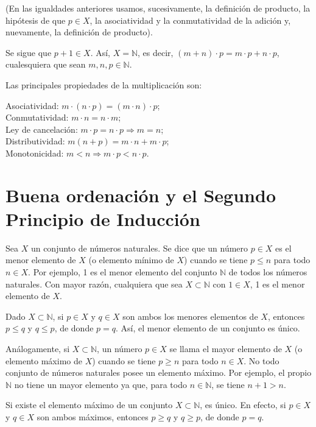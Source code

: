 (En las igualdades anteriores usamos, sucesivamente, la definición de producto, la hipótesis de que \(p \in X\), la asociatividad y la conmutatividad de la adición y, nuevamente, la definición de producto).

Se sigue que \(p + 1 \in X\). Así, \(X = \mathbb{N}\), es decir, \((m + n) \cdot p = m \cdot p + n \cdot p\), cualesquiera que sean \(m, n, p \in \mathbb{N}\).

Las principales propiedades de la multiplicación son:

Asociatividad: \(m \cdot (n \cdot p) = (m \cdot n) \cdot p\);\\
Conmutatividad: \(m \cdot n = n \cdot m\);\\
Ley de cancelación: \(m \cdot p = n \cdot p \Rightarrow m = n\);\\
Distributividad: \(m(n + p) = m \cdot n + m \cdot p\);\\
Monotonicidad: \(m < n \Rightarrow m \cdot p < n \cdot p\).

\section{Buena ordenación y el Segundo Principio de Inducción}

Sea \( X \) un conjunto de números naturales. Se dice que un número \( p \in X \) es el menor elemento de \( X \) (o elemento mínimo de \( X \)) cuando se tiene \( p \leq n \) para todo \( n \in X \). Por ejemplo, 1 es el menor elemento del conjunto \( \mathbb{N} \) de todos los números naturales. Con mayor razón, cualquiera que sea \( X \subset \mathbb{N} \) con \( 1 \in X \), 1 es el menor elemento de \( X \).

Dado \( X \subset \mathbb{N} \), si \( p \in X \) y \( q \in X \) son ambos los menores elementos de \( X \), entonces \( p \leq q \) y \( q \leq p \), de donde \( p = q \). Así, el menor elemento de un conjunto es único.

Análogamente, si \( X \subset \mathbb{N} \), un número \( p \in X \) se llama el mayor elemento de \( X \) (o elemento máximo de \( X \)) cuando se tiene \( p \geq n \) para todo \( n \in X \). No todo conjunto de números naturales posee un elemento máximo. Por ejemplo, el propio \( \mathbb{N} \) no tiene un mayor elemento ya que, para todo \( n \in \mathbb{N} \), se tiene \( n + 1 > n \).

Si existe el elemento máximo de un conjunto \( X \subset \mathbb{N} \), es único. En efecto, si \( p \in X \) y \( q \in X \) son ambos máximos, entonces \( p \geq q \) y \( q \geq p \), de donde \( p = q \).

